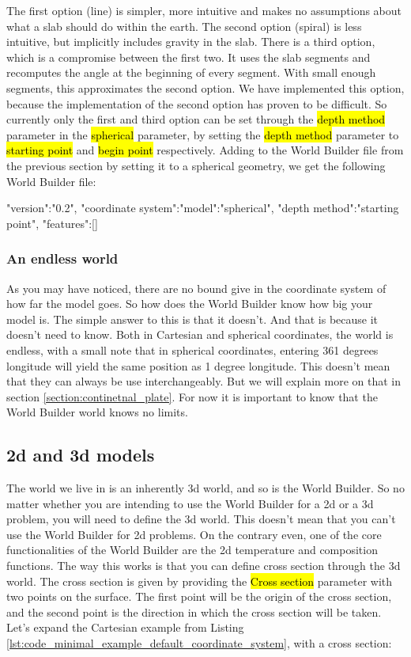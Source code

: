 \documentclass{book}
\newcommand{\WB}{{World Builder}}
\begin{document}
The first option (line) is simpler, more intuitive and makes no assumptions about what a slab should do within the earth. The second option (spiral) is less intuitive, but implicitly includes gravity in the slab. There is a third option, which is a compromise between the first two. It uses the slab segments and recomputes the angle at the beginning of every segment. With small enough segments, this approximates the second option. We have implemented this option, because the implementation of the second option has proven to be difficult. So currently only the first and third option can be set through the \hl{depth method} parameter in the \hl{spherical} parameter, by setting the \hl{depth method} parameter to \hl{starting point} and \hl{begin point} respectively. Adding to the \WB{} file from the previous section by setting it to a spherical geometry, we get the following \WB{} file:

\begin{javascriptcode}{}{}
{
  "version":"0.2",
  "coordinate system":{"model":"spherical", "depth method":"starting point"},
  "features":[]
}
\end{javascriptcode}


\subsubsection{An endless world}
As you may have noticed, there are no bound give in the coordinate system of how far the model goes. So how does the \WB{} know how big your model is. The simple answer to this is that it doesn't. And that is because it doesn't need to know. Both in Cartesian and spherical coordinates, the world is endless, with a small note that in spherical coordinates, entering 361 degrees longitude will yield the same position as 1 degree longitude. This doesn't mean that they can always be use interchangeably. But we will explain more on that in section \ref{section:continetnal_plate}. For now it is important to know that the \WB{} world knows no limits.

\subsection{2d and 3d models}
The world we live in is an inherently 3d world, and so is the \WB{}. So no matter whether you are intending to use the \WB{} for a 2d or a 3d problem, you will need to define the 3d world. This doesn't mean that you can't use the \WB{} for 2d problems. On the contrary even, one of the core functionalities of the \WB{} are the 2d temperature and composition functions. The way this works is that you can define cross section through the 3d world. The cross section is given by providing the \hl{Cross section} parameter with two points on the surface. The first point will be the origin of the cross section, and the second point is the direction in which the cross section will be taken. Let's expand the Cartesian example from Listing \ref{lst:code_minimal_example_default_coordinate_system}, with a cross section:
\end{document}
